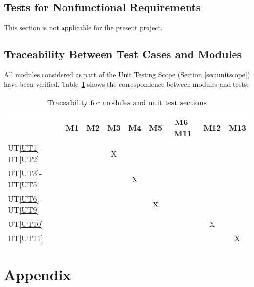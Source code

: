 \documentclass[12pt, titlepage]{article}
\newcommand{\uref}[1]{UT\ref{#1}}
\begin{document}
\subsection{Tests for Nonfunctional Requirements}

%

This section is not applicable for the present project.

\subsection{Traceability Between Test Cases and Modules}
\label{section:unittraceability}

All modules considered as part of the Unit Testing Scope (Section 
\ref{sec:unitscope}) have been verified. Table~\ref{table:moduletraceab} shows 
the correspondence between modules and tests:

\begin{table}[ht]
	\centering
	\begin{tabular}{l|c|c|c|c|c|c|c|c}
		\hline
		&M1& M2& M3& M4& M5& M6-M11& M12& M13\\	\hline	
		\uref{UT1}-\uref{UT2}&  & & X& & & &&\\ \hline
		\uref{UT3}-\uref{UT5}&  & & &X & & &&\\ \hline
		\uref{UT6}-\uref{UT9}&  & & & &X & &&\\ \hline
		\uref{UT10}&  & & & & & &X&\\ \hline
		\uref{UT11}&  & & & & & &&X\\ \hline
	\end{tabular}
	\caption{Traceability for modules and unit test sections}
	\label{table:moduletraceab}
\end{table}

				




\newpage

\section{Appendix}
\label{section:appendix}

\end{document}

